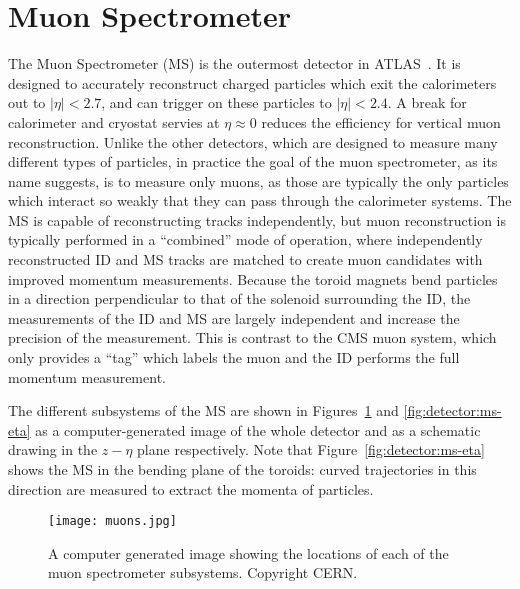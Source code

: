 



\section{Muon Spectrometer}

The Muon Spectrometer (MS) is the outermost detector in ATLAS~\cite{ATLASPaper}. It is designed to accurately reconstruct charged particles which exit the calorimeters out to $|\eta| < 2.7$, and can trigger on these particles to $|\eta| < 2.4$. A break for calorimeter and cryostat servies at $\eta \approx 0$ reduces the efficiency for vertical muon reconstruction.  Unlike the other detectors, which are designed to measure many different types of particles, in practice the goal of the muon spectrometer, as its name suggests, is to measure only muons, as those are typically the only particles which interact so weakly that they can pass through the calorimeter systems. The MS is capable of reconstructing tracks independently, but muon reconstruction is typically performed in a ``combined'' mode of operation, where independently reconstructed ID and MS tracks are matched to create muon candidates with improved momentum measurements. Because the toroid magnets bend particles in a direction perpendicular to that of the solenoid surrounding the ID, the measurements of the ID and MS are largely independent and increase the precision of the measurement. This is contrast to the CMS muon system, which only provides a ``tag'' which labels the muon and the ID performs the full momentum measurement.

The different subsystems of the MS are shown in Figures~\ref{fig:detector:ms} and \ref{fig:detector:ms-eta} as a computer-generated image of the whole detector and as a schematic drawing in the $z-\eta$ plane respectively. Note that Figure~\ref{fig:detector:ms-eta} shows the MS in the bending plane of the toroids: curved trajectories in this direction are measured to extract the momenta of particles. 



\begin{figure}
\centering
\texttt{[image: muons.jpg]}
\label{fig:detector:ms}
\caption{A computer generated image showing the locations of each of the muon spectrometer subsystems. Copyright CERN.}
\end{figure}



